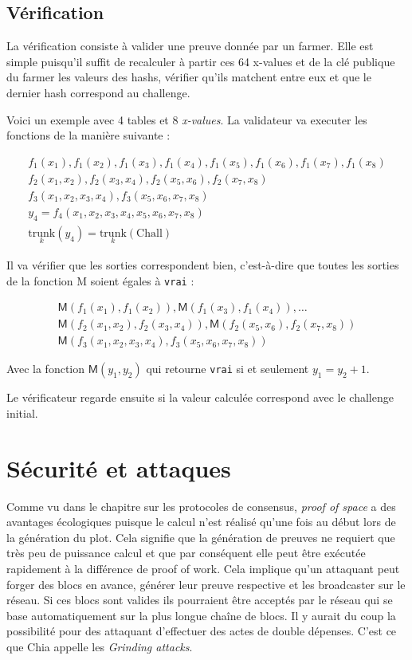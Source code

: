 \subsection{Vérification}

La vérification consiste à valider une preuve donnée par un farmer. Elle est simple puisqu'il suffit de recalculer à partir ces 64 x-values et de la clé publique du farmer les valeurs des hashs, vérifier qu'ils matchent entre eux et que le dernier hash correspond au challenge.

Voici un exemple avec 4 tables et 8 \emph{x-values}. La validateur va executer les fonctions de la manière suivante :

\begin{gather*}
  f_1(x_1), f_1(x_2), f_1(x_3), f_1(x_4), f_1(x_5), f_1(x_6), f_1(x_7), f_1(x_8) \\
  f_2(x_1,x_2), f_2(x_3,x_4), f_2(x_5,x_6), f_2(x_7,x_8) \\
  f_3(x_1,x_2,x_3,x_4), f_3(x_5,x_6,x_7,x_8) \\
  y_4 = f_4(x_1,x_2,x_3,x_4,x_5,x_6,x_7,x_8) \\
  \underset{k}{\mathrm{trunk}}(y_4)=\underset{k}{\mathrm{trunk}}(\mathrm{Chall})
\end{gather*}

Il va vérifier que les sorties correspondent bien, c'est-à-dire que toutes les sorties de la fonction \textsf{M} soient égales à \texttt{vrai} :

\begin{gather*}
  \mathsf{M}(f_1(x_1), f_1(x_2)),\mathsf{M}(f_1(x_3), f_1(x_4)),\dots \\
  \mathsf{M}(f_2(x_1,x_2),f_2(x_3,x_4)),\mathsf{M}(f_2(x_5,x_6),f_2(x_7,x_8)) \\
  \mathsf{M}(f_3(x_1,x_2,x_3,x_4), f_3(x_5,x_6,x_7,x_8))
\end{gather*}

Avec la fonction $\mathsf{M}(y_1,y_2)$ qui retourne \texttt{vrai} si et seulement $y_1 = y_2 + 1$.

Le vérificateur regarde ensuite si la valeur calculée correspond avec le challenge initial.

\section{Sécurité et attaques}

Comme vu dans le chapitre sur les protocoles de consensus, \emph{proof of space} a des avantages écologiques puisque le calcul n'est réalisé qu'une fois au début lors de la génération du plot. Cela signifie que la génération de preuves ne requiert que très peu de puissance calcul et que par conséquent elle peut être exécutée rapidement à la différence de proof of work. Cela implique qu'un attaquant peut forger des blocs en avance, générer leur preuve respective et les broadcaster sur le réseau. Si ces blocs sont valides ils pourraient être acceptés par le réseau qui se base automatiquement sur la plus longue chaîne de blocs. Il y aurait du coup la possibilité pour des attaquant d'effectuer des actes de double dépenses. C'est ce que Chia appelle les \emph{Grinding attacks}.

